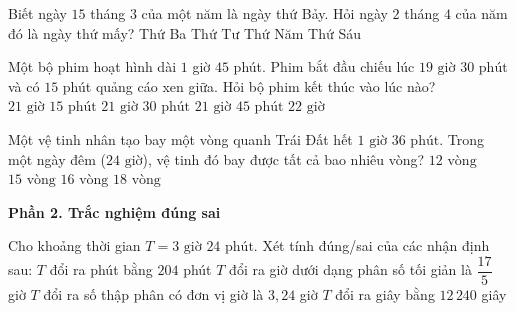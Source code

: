 \begin{ex} %
Biết ngày $15$ tháng $3$ của một năm là ngày thứ Bảy. Hỏi ngày $2$ tháng $4$ của năm đó là ngày thứ mấy?
\choice
{Thứ Ba}
{\True Thứ Tư}
{Thứ Năm}
{Thứ Sáu}
\end{ex}

\begin{ex} %
Một bộ phim hoạt hình dài $1$ giờ $45$ phút. Phim bắt đầu chiếu lúc $19\text{ giờ } 30\text{ phút}$ và có $15$ phút quảng cáo xen giữa. Hỏi bộ phim kết thúc vào lúc nào?
\choice
{$21\text{ giờ } 15\text{ phút}$}
{\True $21\text{ giờ } 30\text{ phút}$}
{$21\text{ giờ } 45\text{ phút}$}
{$22\text{ giờ}$}
\end{ex}

\begin{ex} %
Một vệ tinh nhân tạo bay một vòng quanh Trái Đất hết $1\text{ giờ } 36\text{ phút}$. Trong một ngày đêm ($24\text{ giờ}$), vệ tinh đó bay được tất cả bao nhiêu vòng?
\choice
{$12\text{ vòng}$}
{\True $15\text{ vòng}$}
{$16\text{ vòng}$}
{$18\text{ vòng}$}
\end{ex}

\textbf{Phần 2. Trắc nghiệm đúng sai}

\begin{ex} %
Cho khoảng thời gian $T = 3\text{ giờ } 24\text{ phút}$. Xét tính đúng/sai của các nhận định sau:
\choiceTF
{\True $T$ đổi ra phút bằng $204$ phút}
{\True $T$ đổi ra giờ dưới dạng phân số tối giản là $\dfrac{17}{5}$ giờ}
{$T$ đổi ra số thập phân có đơn vị giờ là $3{,}24$ giờ}
{\True $T$ đổi ra giây bằng $12\,240$ giây}
\end{ex}

